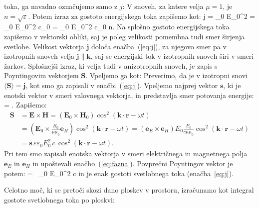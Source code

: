 toka, ga navadno označujemo samo z $j$:
V snoveh, za katere velja $\mu = 1$, je $n = \sqrt{\varepsilon}$. Potem izraz za gostoto
energijskega toka zapišemo kot:
\beq
j = \varepsilon \varepsilon_0 E_0^2  = 
\sqrt{\varepsilon} \varepsilon_0 E_0^2 c_0 =  \varepsilon_0 E_0^2 c_0 n.
\label{eq:03_33}
\eeq
Na splošno gostoto energijskega toka zapišemo v vektorski obliki, saj je poleg velikosti
pomembna tudi smer širjenja svetlobe. Velikost vektorja $\mathbf{j}$ določa 
enačba~(\ref{eq:j}), za njegovo smer pa v izotropnih snoveh velja $\mathbf{j}\parallel \mathbf{k}$,
saj se energijski tok v izotropnih snoveh širi v smeri žarkov. 
Splošnejši izraz, ki velja tudi v anizotropnih snoveh, je
zapis s Poyntingovim vektorjem $\mathbf{S}$. Vpeljemo ga kot:
Preverimo, da je v izotropni snovi $\langle\mathbf{S}\rangle = \mathbf{j}$, kot smo ga zapisali 
v enačbi~(\ref{eq:j}). Vpeljemo najprej vektor $\mathbf{s}$, ki je enotski vektor
v smeri valovnega vektorja, in predstavlja smer potovanja energije:
\beq
{} = .
\label{eq:03_34}
\eeq
Zapišemo:
\begin{align}
\mathbf{S}&=\mathbf{E}\times \mathbf{H} = \left( \mathbf{E}_0\times \mathbf{H}_0 \right)
\cos^2 \left(\mathbf{k}\cdot \mathbf{r} - \omega t\right) \\
& =  \left( \mathbf{E}_0 \times \frac{B_0}{\mu\mu_0}\mathbf{e}_H \right) 
\cos^2 \left(\mathbf{k}\cdot \mathbf{r} - \omega t\right) = 
\left(\mathbf{e}_E \times \mathbf{e}_H \right)E_0\frac{E_0}{c\mu\mu_0} 
\cos^2 \left(\mathbf{k}\cdot \mathbf{r} - \omega t\right)\\
&= \mathbf{s}\, \varepsilon \varepsilon_0 E_0^2\,c\, \cos^2 \left(\mathbf{k}\cdot \mathbf{r} - \omega t\right)\!.
\label{eq:03_35}
\end{align}
Pri tem smo zapisali enotska vektorja v smeri električnega in magnetnega polja 
$\mathbf{e}_E$ in $\mathbf{e}_H$ in upoštevali enačbo~(\ref{eq:fazna}). 
Povprečni Poyntingov vektor je potem:
\beq
\langle{}\rangle =  
\, \varepsilon \varepsilon_0 E_0^2 c
\label{eq:03_36}
\eeq
in je enak gostoti svetlobnega toka (enačba~\ref{eq:j}).

Celotno moč, ki se pretoči skozi dano ploskev v prostoru, izračunamo kot 
integral gostote svetlobnega toka po ploskvi:

